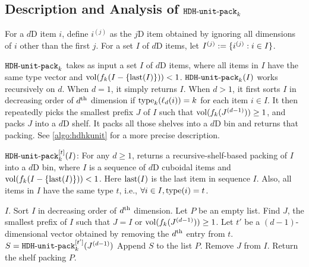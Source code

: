 \subsection{Description and Analysis of \texorpdfstring{$\operatorname{\mathtt{HDH-unit-pack}}_k$}{HDH-unit-pack}}

For a $d$D item $i$, define $i^{(j)}$ as the $j$D item
obtained by ignoring all dimensions of $i$ other than the first $j$.
For a set $I$ of $d$D items, let $I^{(j)} := \{i^{(j)}: i \in I\}$.

$\operatorname{\mathtt{HDH-unit-pack}}_k$ takes as input a set $I$ of $d$D items,
where all items in $I$ have the same type vector and $\operatorname{vol}(f_k(I - \{\operatorname{last}(I)\})) < 1$.
$\operatorname{\mathtt{HDH-unit-pack}}_k(I)$ works recursively on $d$.
When $d = 1$, it simply returns $I$.
When $d > 1$, it first sorts $I$ in decreasing order of $d^{\textrm{th}}$ dimension
if $\operatorname{type}_k(\ell_d(i)) = k$ for each item $i \in I$.
It then repeatedly picks the smallest prefix $J$ of $I$ such that $\operatorname{vol}(f_k(J^{(d-1)})) \ge 1$,
and packs $J$ into a $d$D shelf.
It packs all those shelves into a $d$D bin and returns that packing.
See \cref{algo:hdhkunit} for a more precise description.

\begin{algorithm}[!ht]
\caption{$\operatorname{\mathtt{HDH-unit-pack}}_k^{[t]}(I)$:
For any $d \ge 1$, returns a recursive-shelf-based packing of $I$ into a $d$D bin,
where $I$ is a sequence of $d$D cuboidal items
and $\operatorname{vol}(f_k(I-\{\operatorname{last}(I)\})) < 1$.
Here $\operatorname{last}(I)$ is the last item in sequence $I$.
Also, all items in $I$ have the same type $t$, i.e.,
$\forall i \in I, \operatorname{type}(i) = t$.}
\label{algo:hdhkunit}
\begin{algorithmic}[1]
    \State \Return $I$.
\EndIf
{}
    \State \label{alg-line:hdhunit:sort}Sort $I$ in decreasing order of $d^{\textrm{th}}$ dimension.
\EndIf
{}
\State Let $P$ be an empty list.
    \State \label{alg-line:hdhunit:prefix}Find $J$, the smallest prefix of $I$ such that
        $J = I$ or $\operatorname{vol}(f_k(J^{(d-1)})) \ge 1$.
    \State Let $t'$ be a $(d-1)$-dimensional vector obtained by
        removing the $d^{\textrm{th}}$ entry from $t$.
    \State \label{alg-line:hdhunit:recurse}$S = \operatorname{\mathtt{HDH-unit-pack}}_k^{[t']}(J^{(d-1)})$
    \State Append $S$ to the list $P$.
    \State Remove $J$ from $I$.
\EndWhile
\State Return the shelf packing $P$.
\end{algorithmic}
\end{algorithm}

